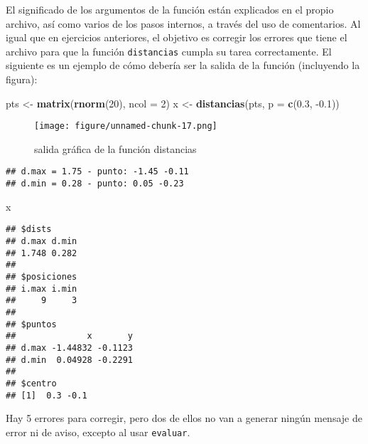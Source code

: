\documentclass[]{article}
\makeatletter
\newenvironment{Shaded}{}{}
\newcommand{\KeywordTok}[1]{\textcolor[rgb]{0.00,0.44,0.13}{\textbf{{#1}}}}
\newcommand{\DataTypeTok}[1]{\textcolor[rgb]{0.56,0.13,0.00}{{#1}}}
\newcommand{\DecValTok}[1]{\textcolor[rgb]{0.25,0.63,0.44}{{#1}}}
\newcommand{\FloatTok}[1]{\textcolor[rgb]{0.25,0.63,0.44}{{#1}}}
\newcommand{\StringTok}[1]{\textcolor[rgb]{0.25,0.44,0.63}{{#1}}}
\newcommand{\NormalTok}[1]{{#1}}
\def\maxwidth{\ifdim\Gin@nat@width>\linewidth\linewidth
\else\Gin@nat@width\fi}
\let\Oldincludegraphics\includegraphics
\renewcommand{\includegraphics}[1]{\Oldincludegraphics[width=\maxwidth]{#1}}
\makeatother
\begin{document}
El significado de los argumentos de la función están explicados en el
propio archivo, así como varios de los pasos internos, a través del uso
de comentarios. Al igual que en ejercicios anteriores, el objetivo es
corregir los errores que tiene el archivo para que la función
\texttt{distancias} cumpla su tarea correctamente. El siguiente es un
ejemplo de cómo debería ser la salida de la función (incluyendo la
figura):

\begin{Shaded}
\begin{Highlighting}[]
\NormalTok{pts <-}\StringTok{ }\KeywordTok{matrix}\NormalTok{(}\KeywordTok{rnorm}\NormalTok{(}\DecValTok{20}\NormalTok{), }\DataTypeTok{ncol =} \DecValTok{2}\NormalTok{)}
\NormalTok{x <-}\StringTok{ }\KeywordTok{distancias}\NormalTok{(pts, }\DataTypeTok{p =} \KeywordTok{c}\NormalTok{(}\FloatTok{0.3}\NormalTok{, -}\FloatTok{0.1}\NormalTok{))}
\end{Highlighting}
\end{Shaded}

\begin{figure}[htbp]
\centering
\texttt{[image: figure/unnamed-chunk-17.png]}
\caption{salida gráfica de la función distancias}
\end{figure}

\begin{verbatim}
## d.max = 1.75 - punto: -1.45 -0.11 
## d.min = 0.28 - punto: 0.05 -0.23
\end{verbatim}

\begin{Shaded}
\begin{Highlighting}[]
\NormalTok{x}
\end{Highlighting}
\end{Shaded}

\begin{verbatim}
## $dists
## d.max d.min 
## 1.748 0.282 
## 
## $posiciones
## i.max i.min 
##     9     3 
## 
## $puntos
##              x       y
## d.max -1.44832 -0.1123
## d.min  0.04928 -0.2291
## 
## $centro
## [1]  0.3 -0.1
\end{verbatim}

Hay 5 errores para corregir, pero dos de ellos no van a generar ningún
mensaje de error ni de aviso, excepto al usar \texttt{evaluar}.
\end{document}

